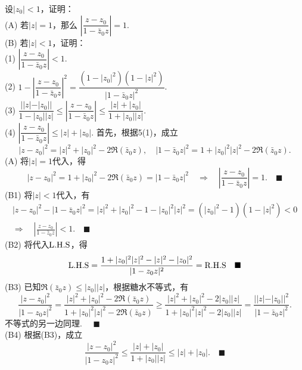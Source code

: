 \vspace{1cm}
\par{} 设$|z_0|<1$，证明：\\
(A) 若$|z|=1$，那么 $\left|\dfrac{z-z_0}{1-\bar{z}_0z}\right|=1$.\\
(B) 若$|z|<1$，证明：\\
(1) $\left|\dfrac{z-z_0}{1-\bar{z}_0z}\right|<1$.\\
(2) $1-\left|\dfrac{z-z_0}{1-\bar{z}_0z}\right|^2 =
     \dfrac{(1-|z_0|^2)(1-|z|^2)}{|1-\bar{z}_0z|^2}$.\\
(3) $\dfrac{||z|-|z_0||}{1-|z_0||z|} \le
     \left|\dfrac{z-z_0}{1-\bar{z}_0z}\right| \le
      \dfrac{|z|+|z_0|}{1+|z_0||z|}$.\\
(4) $\left|\dfrac{z-z_0}{1-\bar{z}_0z}\right| \le |z|+|z_0|$.
\proof
  首先，根据5(1)，成立
  \begin{equation}
    \label{eq1}
    |z-z_0|^2 = |z|^2 + |z_0|^2 - 2\Re(\bar{z}_0z)
    ,\quad
    |1-\bar{z}_0z|^2 = 1 + |z_0|^2|z|^2 - 2\Re(\bar{z}_0z).
  \end{equation}
(A) 将$|z|=1$代入，得
  \[
    |z-z_0|^2 = 1 + |z_0|^2 - 2\Re(\bar{z}_0z) = |1-\bar{z}_0z|^2
    \quad\Rightarrow\quad \left|\frac{z-z_0}{1-\bar{z}_0z}\right| = 1. \quad\blacksquare
  \]
(B1) 将$|z|<1$代入，有
  \begin{gather*}
    |z-z_0|^2 - |1-\bar{z}_0z|^2 = |z|^2 + |z_0|^2 - 1 - |z_0|^2|z|^2
     = (|z_0|^2-1)(1-|z|^2) < 0 \\
    \Rightarrow\quad
    \left|\frac{z-z_0}{1-\bar{z}_0z}\right| < 1.\quad\blacksquare
  \end{gather*}
(B2) 将代入$\text{L.H.S}$，得
  \[
    \text{L.H.S} = \frac{1+|z_0|^2|z|^2 - |z|^2 - |z_0|^2}{|1-z_0z|^2} = \text{R.H.S}
    \quad\blacksquare
  \]
(B3) 已知$\Re(\bar{z}_0z) \le |z_0||z|$，根据糖水不等式，有
  \[
    \frac{|z-z_0|^2}{|1-z_0z|^2} =
    \frac{|z|^2+|z_0|^2-2\Re(\bar{z}_0z)}{1+|z_0|^2|z|^2-2\Re(\bar{z}_0z)}
    \ge \frac{|z|^2+|z_0|^2 - 2|z_0||z|}{1+|z_0|^2|z|^2-2|z_0||z|} =
    \frac{||z|-|z_0||^2}{|1-\bar{z}_0z|^2}.
  \]
  不等式的另一边同理. $\quad\blacksquare$\\
(B4) 根据(B3)，成立
  \[
    \frac{|z-z_0|^2}{|1-z_0z|^2} \le \frac{|z|+|z_0|}{1+|z_0||z|} \le |z|+|z_0|.
    \quad\blacksquare
  \]

